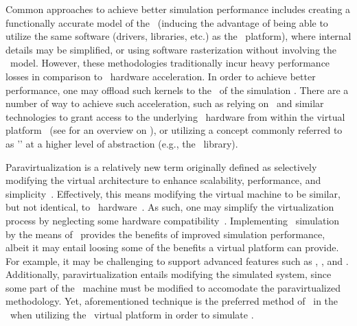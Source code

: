 Common approaches to achieve better simulation performance includes creating a functionally accurate model of the \dvttermgpu\ (inducing the advantage of being able to utilize the same software (drivers, libraries, etc.) as the \dvttermhost\ platform), where internal details may be simplified, or using software rasterization without involving the \dvttermgpu\ model.
However, these methodologies traditionally incur heavy performance losses in comparison to \dvttermgpu\ hardware acceleration.
In order to achieve better performance, one may offload such kernels to the \dvttermgpu\ of the simulation \dvttermhost .
There are a number of way to achieve such acceleration, such as relying on \dvttermpcipassthrough\ and similar technologies to grant access to the underlying \dvttermhost\ hardware from within the virtual platform~ (see  for an overview on \dvttermpcipassthrough ), or utilizing a concept commonly referred to as '\dvttermparavirtualization ' at a higher level of abstraction (e.g., the \dvttermopengl\ library).

Paravirtualization is a relatively new term originally defined as selectively modifying the virtual architecture to enhance scalability, performance, and simplicity~.
Effectively, this means modifying the virtual machine to be similar, but not identical, to \dvttermhost\ hardware~.
As such, one may simplify the virtualization process by neglecting some hardware compatibility~.
Implementing \dvttermgpu\ simulation by the means of \dvttermparavirtualization\ provides the benefits of improved simulation performance, albeit it may entail loosing some of the benefits a virtual platform can provide.
For example, it may be challenging to support advanced features such as \dvttermdeterministicexecution , \dvttermcheckpointing , and \dvttermreverseexecution .
Additionally, paravirtualization entails modifying the simulated system, since some part of the \dvttermtarget\ machine must be modified to accomodate the paravirtualized methodology.
Yet, aforementioned technique is the preferred method of \dvttermgoogle\ in the \dvttermandroidsdk\ when utilizing the \dvttermqemu\ virtual platform in order to simulate \dvttermopengles .

